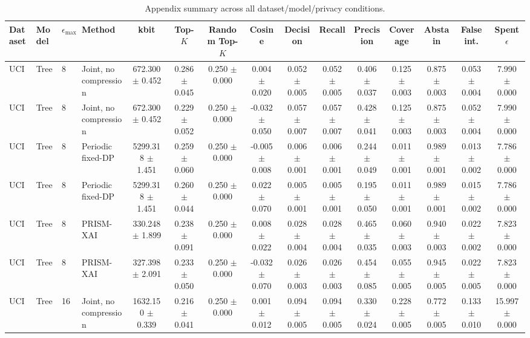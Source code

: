 \begin{table}[t]
\caption{Appendix summary across all dataset/model/privacy conditions.}
\label{tab:appendix-conditions}
\centering
\scriptsize
\setlength{\tabcolsep}{2.5pt}
\begin{tabular}{llllccccccccccc}
\toprule
Dataset & Model & $\epsilon_{\max}$ & Method & kbit & Top-$K$ & Random Top-$K$ & Cosine & Decision & Recall & Precision & Coverage & Abstain & False int. & Spent $\epsilon$ \\
\midrule
UCI & Tree & 8 & Joint, no compression & 672.300 $\pm$ 0.452 & 0.286 $\pm$ 0.045 & 0.250 $\pm$ 0.000 & 0.004 $\pm$ 0.020 & 0.052 $\pm$ 0.005 & 0.052 $\pm$ 0.005 & 0.406 $\pm$ 0.037 & 0.125 $\pm$ 0.003 & 0.875 $\pm$ 0.003 & 0.053 $\pm$ 0.004 & 7.990 $\pm$ 0.000 \\
UCI & Tree & 8 & Joint, no compression & 672.300 $\pm$ 0.452 & 0.229 $\pm$ 0.052 & 0.250 $\pm$ 0.000 & -0.032 $\pm$ 0.050 & 0.057 $\pm$ 0.007 & 0.057 $\pm$ 0.007 & 0.428 $\pm$ 0.041 & 0.125 $\pm$ 0.003 & 0.875 $\pm$ 0.003 & 0.052 $\pm$ 0.004 & 7.990 $\pm$ 0.000 \\
UCI & Tree & 8 & Periodic fixed-DP & 5299.318 $\pm$ 1.451 & 0.259 $\pm$ 0.060 & 0.250 $\pm$ 0.000 & -0.005 $\pm$ 0.008 & 0.006 $\pm$ 0.001 & 0.006 $\pm$ 0.001 & 0.244 $\pm$ 0.049 & 0.011 $\pm$ 0.001 & 0.989 $\pm$ 0.001 & 0.013 $\pm$ 0.002 & 7.786 $\pm$ 0.000 \\
UCI & Tree & 8 & Periodic fixed-DP & 5299.318 $\pm$ 1.451 & 0.260 $\pm$ 0.044 & 0.250 $\pm$ 0.000 & 0.022 $\pm$ 0.070 & 0.005 $\pm$ 0.001 & 0.005 $\pm$ 0.001 & 0.195 $\pm$ 0.050 & 0.011 $\pm$ 0.001 & 0.989 $\pm$ 0.001 & 0.015 $\pm$ 0.002 & 7.786 $\pm$ 0.000 \\
UCI & Tree & 8 & PRISM-XAI & 330.248 $\pm$ 1.899 & 0.238 $\pm$ 0.091 & 0.250 $\pm$ 0.000 & 0.008 $\pm$ 0.022 & 0.028 $\pm$ 0.004 & 0.028 $\pm$ 0.004 & 0.465 $\pm$ 0.035 & 0.060 $\pm$ 0.003 & 0.940 $\pm$ 0.003 & 0.022 $\pm$ 0.002 & 7.823 $\pm$ 0.000 \\
UCI & Tree & 8 & PRISM-XAI & 327.398 $\pm$ 2.091 & 0.233 $\pm$ 0.050 & 0.250 $\pm$ 0.000 & -0.032 $\pm$ 0.070 & 0.026 $\pm$ 0.003 & 0.026 $\pm$ 0.003 & 0.454 $\pm$ 0.085 & 0.055 $\pm$ 0.005 & 0.945 $\pm$ 0.005 & 0.022 $\pm$ 0.005 & 7.823 $\pm$ 0.000 \\
UCI & Tree & 16 & Joint, no compression & 1632.150 $\pm$ 0.339 & 0.216 $\pm$ 0.041 & 0.250 $\pm$ 0.000 & 0.001 $\pm$ 0.012 & 0.094 $\pm$ 0.005 & 0.094 $\pm$ 0.005 & 0.330 $\pm$ 0.024 & 0.228 $\pm$ 0.005 & 0.772 $\pm$ 0.005 & 0.133 $\pm$ 0.010 & 15.997 $\pm$ 0.000 \\

\end{tabular}
\end{table}
